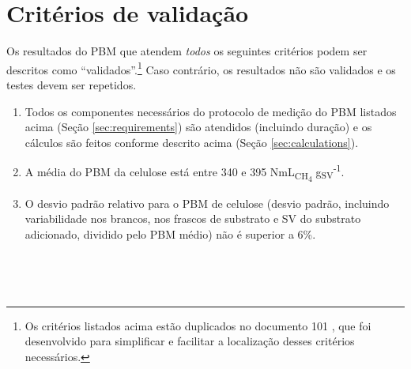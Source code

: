 \documentclass[]{article}
\begin{document}
\section{Critérios de validação}
\label{sec:crit}
Os resultados do PBM que atendem \textit{todos} os seguintes critérios podem ser descritos como ``validados''.\footnote{
Os critérios listados acima estão duplicados no documento 101 \citep{BMPdoc101val}, que foi desenvolvido para simplificar e facilitar a localização desses critérios necessários.
}
Caso contrário, os resultados não são validados e os testes devem ser repetidos.
 
\begin{enumerate}
  \item Todos os componentes necessários do protocolo de medição do PBM listados acima (Seção \ref{sec:requirements}) são atendidos (incluindo duração) e os cálculos são feitos conforme descrito acima (Seção \ref{sec:calculations}).
  \item A média do PBM da celulose está entre 340 e 395 NmL\textsubscript{CH\textsubscript{4}} g\textsubscript{SV}\textsuperscript{-1}.
  \item O desvio padrão relativo para o PBM de celulose (desvio padrão, incluindo variabilidade nos brancos, nos frascos de substrato e SV do substrato adicionado, dividido pelo PBM médio) não é superior a 6\%.
\end{enumerate}
 

 
\end{document}
